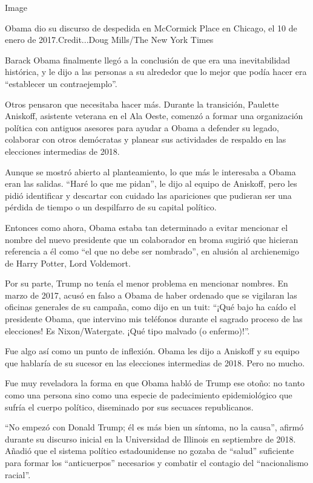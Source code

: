 Image

Obama dio su discurso de despedida en McCormick Place en Chicago, el 10
de enero de 2017.Credit...Doug Mills/The New York Times

Barack Obama finalmente llegó a la conclusión de que era una
inevitabilidad histórica, y le dijo a las personas a su alrededor que lo
mejor que podía hacer era ``establecer un contraejemplo''.

Otros pensaron que necesitaba hacer más. Durante la transición, Paulette
Aniskoff, asistente veterana en el Ala Oeste, comenzó a formar una
organización política con antiguos asesores para ayudar a Obama a
defender su legado, colaborar con otros demócratas y planear sus
actividades de respaldo en las elecciones intermedias de 2018.

Aunque se mostró abierto al planteamiento, lo que más le interesaba a
Obama eran las salidas. ``Haré lo que me pidan'', le dijo al equipo de
Aniskoff, pero les pidió identificar y descartar con cuidado las
apariciones que pudieran ser una pérdida de tiempo o un despilfarro de
su capital político.

Entonces como ahora, Obama estaba tan determinado a evitar mencionar el
nombre del nuevo presidente que un colaborador en broma sugirió que
hicieran referencia a él como ``el que no debe ser nombrado'', en
alusión al archienemigo de Harry Potter, Lord Voldemort.

Por su parte, Trump no tenía el menor problema en mencionar nombres. En
marzo de 2017, acusó en falso a Obama de haber ordenado que se vigilaran
las oficinas generales de su campaña, como dijo en un tuit: ``¡Qué bajo
ha caído el presidente Obama, que intervino mis teléfonos durante el
sagrado proceso de las elecciones! Es Nixon/Watergate. ¡Qué tipo malvado
(o enfermo)!''.

Fue algo así como un punto de inflexión. Obama les dijo a Aniskoff y su
equipo que hablaría de su sucesor en las elecciones intermedias de 2018.
Pero no mucho.

Fue muy reveladora la forma en que Obama habló de Trump ese otoño: no
tanto como una persona sino como una especie de padecimiento
epidemiológico que sufría el cuerpo político, diseminado por sus
secuaces republicanos.

``No empezó con Donald Trump; él es más bien un síntoma, no la causa'',
afirmó durante su discurso inicial en la Universidad de Illinois en
septiembre de 2018. Añadió que el sistema político estadounidense no
gozaba de ``salud'' suficiente para formar los ``anticuerpos''
necesarios y combatir el contagio del ``nacionalismo racial''.

